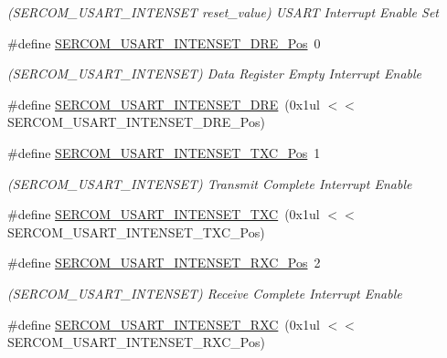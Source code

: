 \begin{DoxyCompactItemize}
\begin{DoxyCompactList}\small\item\em (S\+E\+R\+C\+O\+M\+\_\+\+U\+S\+A\+R\+T\+\_\+\+I\+N\+T\+E\+N\+S\+ET reset\+\_\+value) U\+S\+A\+RT Interrupt Enable Set \end{DoxyCompactList}\item 
\#define \mbox{\hyperlink{group___s_a_m_d21___s_e_r_c_o_m_ga324e6c4ca006e33980271fe7f92c7622}{S\+E\+R\+C\+O\+M\+\_\+\+U\+S\+A\+R\+T\+\_\+\+I\+N\+T\+E\+N\+S\+E\+T\+\_\+\+D\+R\+E\+\_\+\+Pos}}~0
\begin{DoxyCompactList}\small\item\em (S\+E\+R\+C\+O\+M\+\_\+\+U\+S\+A\+R\+T\+\_\+\+I\+N\+T\+E\+N\+S\+ET) Data Register Empty Interrupt Enable \end{DoxyCompactList}\item 
\#define \mbox{\hyperlink{group___s_a_m_d21___s_e_r_c_o_m_ga4563746ecc9b199c9f504672968f912c}{S\+E\+R\+C\+O\+M\+\_\+\+U\+S\+A\+R\+T\+\_\+\+I\+N\+T\+E\+N\+S\+E\+T\+\_\+\+D\+RE}}~(0x1ul $<$$<$ S\+E\+R\+C\+O\+M\+\_\+\+U\+S\+A\+R\+T\+\_\+\+I\+N\+T\+E\+N\+S\+E\+T\+\_\+\+D\+R\+E\+\_\+\+Pos)
\item 
\#define \mbox{\hyperlink{group___s_a_m_d21___s_e_r_c_o_m_gabb0bdb3b9cba5a32f899f5763f8d86c3}{S\+E\+R\+C\+O\+M\+\_\+\+U\+S\+A\+R\+T\+\_\+\+I\+N\+T\+E\+N\+S\+E\+T\+\_\+\+T\+X\+C\+\_\+\+Pos}}~1
\begin{DoxyCompactList}\small\item\em (S\+E\+R\+C\+O\+M\+\_\+\+U\+S\+A\+R\+T\+\_\+\+I\+N\+T\+E\+N\+S\+ET) Transmit Complete Interrupt Enable \end{DoxyCompactList}\item 
\#define \mbox{\hyperlink{group___s_a_m_d21___s_e_r_c_o_m_ga643efdaa93d7f051e49be61009f16e82}{S\+E\+R\+C\+O\+M\+\_\+\+U\+S\+A\+R\+T\+\_\+\+I\+N\+T\+E\+N\+S\+E\+T\+\_\+\+T\+XC}}~(0x1ul $<$$<$ S\+E\+R\+C\+O\+M\+\_\+\+U\+S\+A\+R\+T\+\_\+\+I\+N\+T\+E\+N\+S\+E\+T\+\_\+\+T\+X\+C\+\_\+\+Pos)
\item 
\#define \mbox{\hyperlink{group___s_a_m_d21___s_e_r_c_o_m_ga359fbf2d33fd6545b853062232b6255e}{S\+E\+R\+C\+O\+M\+\_\+\+U\+S\+A\+R\+T\+\_\+\+I\+N\+T\+E\+N\+S\+E\+T\+\_\+\+R\+X\+C\+\_\+\+Pos}}~2
\begin{DoxyCompactList}\small\item\em (S\+E\+R\+C\+O\+M\+\_\+\+U\+S\+A\+R\+T\+\_\+\+I\+N\+T\+E\+N\+S\+ET) Receive Complete Interrupt Enable \end{DoxyCompactList}\item 
\#define \mbox{\hyperlink{group___s_a_m_d21___s_e_r_c_o_m_ga2602b783612126539b072619a5e12673}{S\+E\+R\+C\+O\+M\+\_\+\+U\+S\+A\+R\+T\+\_\+\+I\+N\+T\+E\+N\+S\+E\+T\+\_\+\+R\+XC}}~(0x1ul $<$$<$ S\+E\+R\+C\+O\+M\+\_\+\+U\+S\+A\+R\+T\+\_\+\+I\+N\+T\+E\+N\+S\+E\+T\+\_\+\+R\+X\+C\+\_\+\+Pos)
$$
\end{DoxyCompactItemize}
